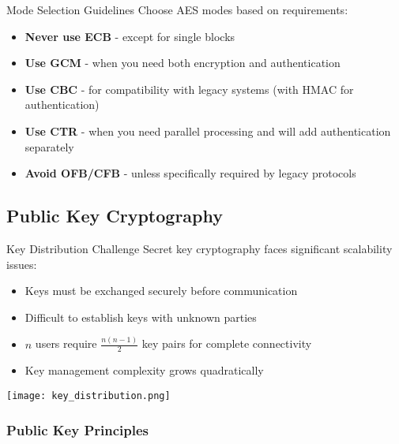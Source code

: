 \normalsize

\begin{KR}{Mode Selection Guidelines}
Choose AES modes based on requirements:
\begin{itemize}
    \item \textbf{Never use ECB} - except for single blocks
    \item \textbf{Use GCM} - when you need both encryption and authentication
    \item \textbf{Use CBC} - for compatibility with legacy systems (with HMAC for authentication)
    \item \textbf{Use CTR} - when you need parallel processing and will add authentication separately
    \item \textbf{Avoid OFB/CFB} - unless specifically required by legacy protocols
\end{itemize}
\end{KR}



\subsection{Public Key Cryptography}

\begin{minipage}{0.5\linewidth}
\begin{concept}{Key Distribution Challenge}
    Secret key cryptography faces significant scalability issues:
    \begin{itemize}
        \item Keys must be exchanged securely before communication
        \item Difficult to establish keys with unknown parties
        \item $n$ users require $\frac{n(n-1)}{2}$ key pairs for complete connectivity
        \item Key management complexity grows quadratically
    \end{itemize}
    
\end{concept}
\end{minipage}
\begin{minipage}{0.5\linewidth}
    \texttt{[image: key\_distribution.png]}
\end{minipage}

\subsubsection{Public Key Principles}

